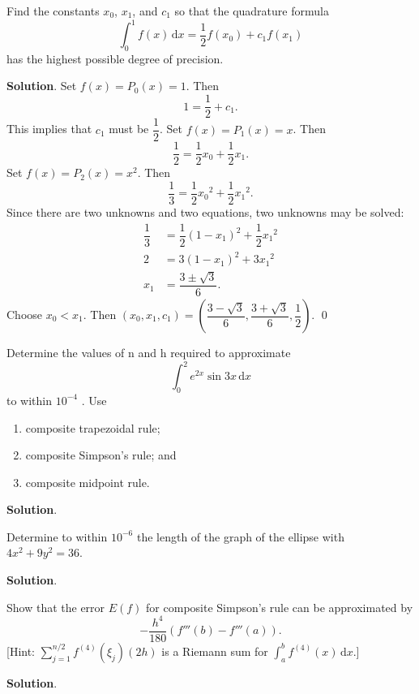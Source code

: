 \documentclass[11pt]{article}
\theoremstyle{break}
\newcommand{\ddi}{\text{$\,$d}}
\numberwithin{equation}{theorem}
\begin{document}
\newpage
\begin{problem}\label{problem 7} %
    Find the constants $x_0$, $x_1$, and $c_1$ so that the quadrature formula $$\int_0^1f(x)\ddi x=\dfrac{1}{2}f(x_0)+c_1f(x_1)$$ has the highest possible degree of precision.
\end{problem}
\textbf{Solution}. Set $f(x)=P_0(x)=1$. Then $$1=\dfrac{1}{2}+c_1.$$ This implies that $c_1$ must be $\dfrac{1}{2}$. Set $f(x)=P_1(x)=x$. Then $$\dfrac{1}{2}=\dfrac{1}{2}x_0+\dfrac{1}{2}x_1.$$ Set $f(x)=P_2(x)=x^2$. Then $$\dfrac{1}{3}=\dfrac{1}{2}{x_0}^2+\dfrac{1}{2}{x_1}^2.$$ Since there are two unknowns and two equations, two unknowns may be solved: \begin{align*}
    \dfrac{1}{3}&=\dfrac{1}{2}\left(1-x_1\right)^2+\dfrac{1}{2}{x_1}^2\\
    2&=3(1-x_1)^2+3{x_1}^2\\
    x_1&=\dfrac{3\pm\sqrt{3}}{6}.
\end{align*}
Choose $x_0<x_1$. Then $(x_0, x_1, c_1)=\left(\dfrac{3-\sqrt{3}}{6}, \dfrac{3+\sqrt{3}}{6}, \dfrac{1}{2}\right)$. \qed


\newpage
\begin{problem}\label{problem 8} %
    Determine the values of n and h required to approximate $$\int_{0}^{2}e^{2x}\sin 3x\ddi x$$ to within $10^{-4}$ . Use
    \begin{enumerate}
        \item composite trapezoidal rule;
        \item composite Simpson's rule; and
        \item composite midpoint rule.
    \end{enumerate}
\end{problem}
\textbf{Solution}. 


\newpage
\begin{problem}\label{problem 9} %
    Determine to within $10^{-6}$ the length of the graph of the ellipse with $4x^2+9y^2=36$.
\end{problem}
\textbf{Solution}. 


\newpage
\begin{problem}\label{problem 10} %
    Show that the error $E(f)$ for composite Simpson's rule can be approximated by $$-\dfrac{h^4}{180}\left(f'''(b)-f'''(a)\right).$$ [Hint: $\displaystyle\sum_{j=1}^{n/2}f^{(4)}(\xi_j)(2h)$ is a Riemann sum for $\displaystyle\int_{a}^{b}f^{(4)}(x)\ddi x$.]
\end{problem}
\textbf{Solution}. 
\end{document}
